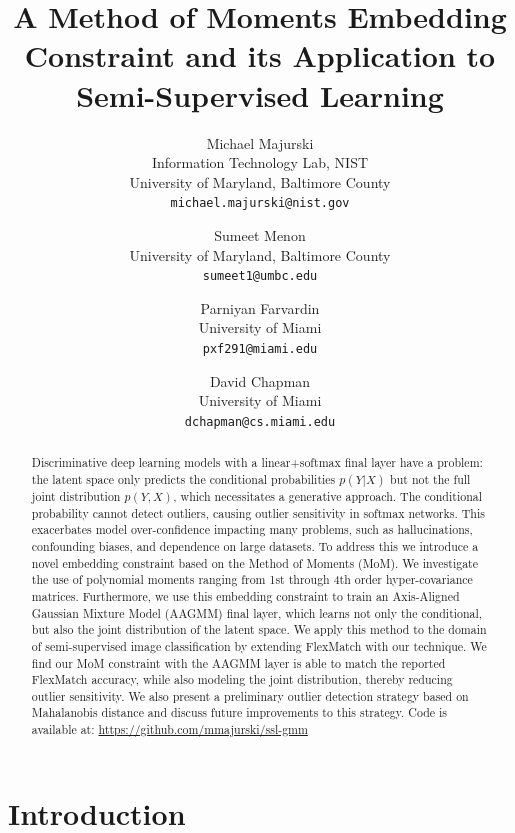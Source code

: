 \documentclass[10pt,twocolumn,letterpaper]{article}
\title{A Method of Moments Embedding Constraint and its Application to Semi-Supervised Learning}
\author{Michael Majurski\\
	Information Technology Lab, NIST\\
	University of Maryland, Baltimore County\\
	{\tt\small michael.majurski@nist.gov}
\and
Sumeet Menon\\
University of Maryland, Baltimore County\\
{\tt\small sumeet1@umbc.edu}
\and
Parniyan Farvardin\\
University of Miami\\
{\tt\small pxf291@miami.edu}
\and
David Chapman\\
University of Miami\\
{\tt\small dchapman@cs.miami.edu}
}
\begin{document}
\maketitle


\begin{abstract}
	Discriminative deep learning models with a linear+softmax final layer have a problem: the latent space only predicts the conditional probabilities $p(Y|X)$ but not the full joint distribution $p(Y,X)$, which necessitates a generative approach.
	The conditional probability cannot detect outliers, causing outlier sensitivity in softmax networks.
	This exacerbates model over-confidence impacting many problems, such as hallucinations, confounding biases, and dependence on large datasets.
	To address this we introduce a novel embedding constraint based on the Method of Moments (MoM).
	We investigate the use of polynomial moments ranging from 1st through 4th order hyper-covariance matrices.
	Furthermore, we use this embedding constraint to train an Axis-Aligned Gaussian Mixture Model (AAGMM) final layer, which learns not only the conditional, but also the joint distribution of the latent space.
	We apply this method to the domain of semi-supervised image classification by extending FlexMatch with our technique.
	We find our MoM constraint with the AAGMM layer is able to match the reported FlexMatch accuracy, while also modeling the joint distribution, thereby reducing outlier sensitivity.  We also present a preliminary outlier detection strategy based on Mahalanobis distance and discuss future improvements to this strategy.  
	Code is available at: \url{https://github.com/mmajurski/ssl-gmm}
\end{abstract}


\section{Introduction}
\end{document}
